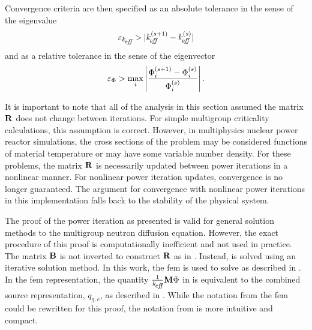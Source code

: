     Convergence criteria are then specified as an absolute 
    tolerance in the sense of the eigenvalue
    \begin{equation}
      \label{eq:eigenvalue_tol}
      \varepsilon_{k_{\!\mbox{\scriptsize \em eff}}} > | k_{\!\mbox{\scriptsize \em eff}}^{(s+1)} - k_{\!\mbox{\scriptsize \em eff}}^{(s)} |
    \end{equation}
    and as a relative tolerance in the sense of the eigenvector
    \begin{equation}
      \label{eq:eigenvector_tol}
      \varepsilon_{\Phi} > \max_i \left| \frac{\Phi_i^{(s+1)} - \Phi_i^{(s)}}
        {\Phi_i^{(s)}}\right| .
    \end{equation}

    It is important to note that all of the analysis in this section assumed the
    matrix $\mathbf{R}$ does not change between iterations. For simple multigroup
    criticality calculations, this assumption is correct. However, in
    multiphysics nuclear power reactor simulations, the cross sections of the 
    problem may be considered functions of material temperature or may have some
    variable number density. For these problems, the matrix $\mathbf{R}$ is necessarily
    updated between power iterations in a nonlinear manner. For nonlinear power
    iteration updates, convergence is no longer guaranteed. The argument for
    convergence with nonlinear power iterations in this implementation falls
    back to the stability of the physical system.

    The proof of the power iteration as presented is valid for general solution
    methods to the multigroup neutron diffusion equation. However, the exact
    procedure of this proof is computationally inefficient and not used in
    practice. The matrix $\mathbf{B}$ is not inverted to construct $\mathbf{R}$ as in
    . Instead,  is solved using an
    iterative solution method. In this work, the \gls{fem} is used to solve
     as described in . In the
    \gls{fem} representation, the quantity $\frac{1}{k_{\!\mbox{\scriptsize \em eff}}} \mathbf{M} \Phi$ in
     is equivalent to the combined source
    representation, $q_{g,e}$, as described in .
    While the notation from the \gls{fem} could be rewritten for this proof, the
    notation from  is more intuitive and compact.
    

